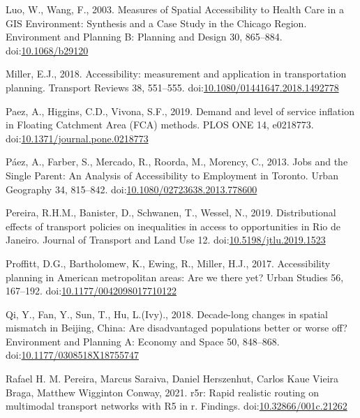 \documentclass[]{elsarticle} %
\newlength{\cslhangindent}
\newlength{\cslentryspacingunit} %
\newenvironment{CSLReferences}[2] %
 {%
  \setlength{\parindent}{0pt}
  \ifodd #1
  \let\oldpar\par
  \def\par{\hangindent=\cslhangindent\oldpar}
  \fi
  \setlength{\parskip}{#2\cslentryspacingunit}
 }%
 {}
\begin{document}
\begin{CSLReferences}{1}{0}
\leavevmode{}%
Luo, W., Wang, F., 2003. Measures of Spatial Accessibility to Health
Care in a GIS Environment: Synthesis and a Case Study in the Chicago
Region. Environment and Planning B: Planning and Design 30, 865--884.
doi:\href{https://doi.org/10.1068/b29120}{10.1068/b29120}

\leavevmode{}%
Miller, E.J., 2018. Accessibility: measurement and application in
transportation planning. Transport Reviews 38, 551--555.
doi:\href{https://doi.org/10.1080/01441647.2018.1492778}{10.1080/01441647.2018.1492778}

\leavevmode{}%
Paez, A., Higgins, C.D., Vivona, S.F., 2019. Demand and level of service
inflation in Floating Catchment Area (FCA) methods. PLOS ONE 14,
e0218773.
doi:\href{https://doi.org/10.1371/journal.pone.0218773}{10.1371/journal.pone.0218773}

\leavevmode{}%
Páez, A., Farber, S., Mercado, R., Roorda, M., Morency, C., 2013. Jobs
and the {Single} {Parent}: {An} {Analysis} of {Accessibility} to
{Employment} in {Toronto}. Urban Geography 34, 815--842.
doi:\href{https://doi.org/10.1080/02723638.2013.778600}{10.1080/02723638.2013.778600}

\leavevmode{}%
Pereira, R.H.M., Banister, D., Schwanen, T., Wessel, N., 2019.
Distributional effects of transport policies on inequalities in access
to opportunities in {Rio} de {Janeiro}. Journal of Transport and Land
Use 12.
doi:\href{https://doi.org/10.5198/jtlu.2019.1523}{10.5198/jtlu.2019.1523}

\leavevmode{}%
Proffitt, D.G., Bartholomew, K., Ewing, R., Miller, H.J., 2017.
Accessibility planning in American metropolitan areas: Are we there yet?
Urban Studies 56, 167--192.
doi:\href{https://doi.org/10.1177/0042098017710122}{10.1177/0042098017710122}

\leavevmode{}%
Qi, Y., Fan, Y., Sun, T., Hu, L.(Ivy)., 2018. Decade-long changes in
spatial mismatch in {Beijing}, {China}: {Are} disadvantaged populations
better or worse off? Environment and Planning A: Economy and Space 50,
848--868.
doi:\href{https://doi.org/10.1177/0308518X18755747}{10.1177/0308518X18755747}

\leavevmode{}%
Rafael H. M. Pereira, Marcus Saraiva, Daniel Herszenhut, Carlos Kaue
Vieira Braga, Matthew Wigginton Conway, 2021. r5r: Rapid realistic
routing on multimodal transport networks with R5 in r. Findings.
doi:\href{https://doi.org/10.32866/001c.21262}{10.32866/001c.21262}


\end{CSLReferences}
\end{document}
